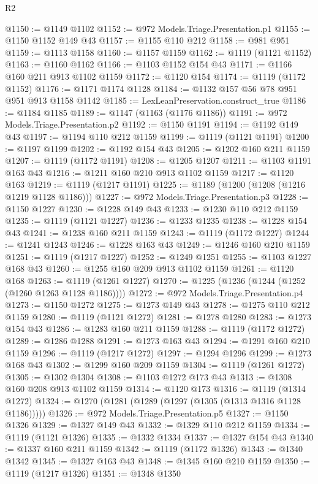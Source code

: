 \begin{lexlean}{R2}
\begin{coremodule}
{{{{{{{{{{{{{{{{{{{{{{{{{{{{{{{{{{{{{{{{{{{@1150 := @1149 @1102
@1152 := @972 Models.Triage.Presentation.p1
@1155 := @1150 @1152 @149 @43
@1157 := @1155 @110 @212
@1158 := @981 @951
@1159 := @1113 @1158
@1160 := @1157 @1159
@1162 := @1119 (@1121 @1152)
@1163 := @1160 @1162
@1166 := @1103 @1152 @154 @43
@1171 := @1166 @160 @211 @913 @1102 @1159
@1172 := @1120 @154
@1174 := @1119 (@1172 @1152)
@1176 := @1171 @1174 @1128
@1184 := @1132 @157 @56 @78 @951 @951 @913 @1158 @1142
@1185 := LexLeanPreservation.construct_true
@1186 := @1184 @1185
@1189 := @1147 (@1163 (@1176 @1186))
@1191 := @972 Models.Triage.Presentation.p2
@1192 := @1150 @1191
@1194 := @1192 @149 @43
@1197 := @1194 @110 @212 @1159
@1199 := @1119 (@1121 @1191)
@1200 := @1197 @1199
@1202 := @1192 @154 @43
@1205 := @1202 @160 @211 @1159
@1207 := @1119 (@1172 @1191)
@1208 := @1205 @1207
@1211 := @1103 @1191 @163 @43
@1216 := @1211 @160 @210 @913 @1102 @1159
@1217 := @1120 @163
@1219 := @1119 (@1217 @1191)
@1225 := @1189 (@1200 (@1208 (@1216 @1219 @1128 @1186)))
@1227 := @972 Models.Triage.Presentation.p3
@1228 := @1150 @1227
@1230 := @1228 @149 @43
@1233 := @1230 @110 @212 @1159
@1235 := @1119 (@1121 @1227)
@1236 := @1233 @1235
@1238 := @1228 @154 @43
@1241 := @1238 @160 @211 @1159
@1243 := @1119 (@1172 @1227)
@1244 := @1241 @1243
@1246 := @1228 @163 @43
@1249 := @1246 @160 @210 @1159
@1251 := @1119 (@1217 @1227)
@1252 := @1249 @1251
@1255 := @1103 @1227 @168 @43
@1260 := @1255 @160 @209 @913 @1102 @1159
@1261 := @1120 @168
@1263 := @1119 (@1261 @1227)
@1270 := @1225 (@1236 (@1244 (@1252 (@1260 @1263 @1128 @1186))))
@1272 := @972 Models.Triage.Presentation.p4
@1273 := @1150 @1272
@1275 := @1273 @149 @43
@1278 := @1275 @110 @212 @1159
@1280 := @1119 (@1121 @1272)
@1281 := @1278 @1280
@1283 := @1273 @154 @43
@1286 := @1283 @160 @211 @1159
@1288 := @1119 (@1172 @1272)
@1289 := @1286 @1288
@1291 := @1273 @163 @43
@1294 := @1291 @160 @210 @1159
@1296 := @1119 (@1217 @1272)
@1297 := @1294 @1296
@1299 := @1273 @168 @43
@1302 := @1299 @160 @209 @1159
@1304 := @1119 (@1261 @1272)
@1305 := @1302 @1304
@1308 := @1103 @1272 @173 @43
@1313 := @1308 @160 @208 @913 @1102 @1159
@1314 := @1120 @173
@1316 := @1119 (@1314 @1272)
@1324 := @1270 (@1281 (@1289 (@1297 (@1305 (@1313 @1316 @1128 @1186)))))
@1326 := @972 Models.Triage.Presentation.p5
@1327 := @1150 @1326
@1329 := @1327 @149 @43
@1332 := @1329 @110 @212 @1159
@1334 := @1119 (@1121 @1326)
@1335 := @1332 @1334
@1337 := @1327 @154 @43
@1340 := @1337 @160 @211 @1159
@1342 := @1119 (@1172 @1326)
@1343 := @1340 @1342
@1345 := @1327 @163 @43
@1348 := @1345 @160 @210 @1159
@1350 := @1119 (@1217 @1326)
@1351 := @1348 @1350
}}}}}}}}}}}}}}}}}}}}}}}}}}}}}}}}}}}}}}}}}}}
\end{coremodule}
\end{lexlean}
